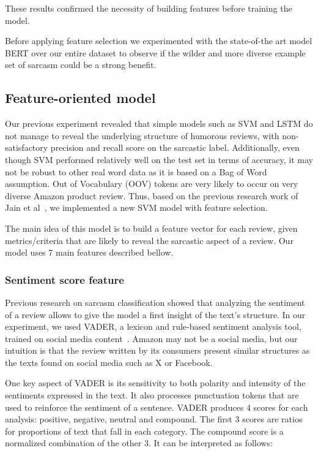 \documentclass[10pt,twocolumn,letterpaper]{article}
\begin{document}
These results confirmed the necessity of building features before training the model.

Before applying feature selection we experimented with the state-of-the art model BERT over our entire dataset to observe if the wilder and more diverse example set of sarcasm could be a strong benefit.

\subsection{Feature-oriented model}

Our previous experiment revealed that simple models such as SVM and LSTM do not manage to reveal the underlying structure of humorous reviews, with non-satisfactory precision and recall score on the sarcastic label.
Additionally, even though SVM performed relatively well on the test set in terms of accuracy, it may not be robust to other real word data as it is based on a Bag of Word assumption. Out of Vocabulary (OOV) tokens are very likely to occur on very diverse Amazon product review.
Thus, based on the previous research work of Jain et al~\cite{jain2019}, we implemented a new SVM model with feature selection.

The main idea of this model is to build a feature vector for each review, given metrics/criteria that are likely to reveal the sarcastic aspect of a review.
Our model uses 7 main features described bellow.

\subsubsection{Sentiment score feature}

Previous research on sarcasm classification showed that analyzing the sentiment of a review allows to give the model a first insight of the text's structure.
In our experiment, we used VADER, a lexicon and rule-based sentiment analysis tool, trained on social media content~\cite{icwsm2014}.
Amazon may not be a social media, but our intuition is that the review written by its consumers present similar structures as the texts found on social media such as X or Facebook.

One key aspect of VADER is its sensitivity to both polarity and intensity of the sentiments expressed in the text.
It also processes punctuation tokens that are used to reinforce the sentiment of a sentence.
VADER produces 4 scores for each analysis: positive, negative, neutral and compound.
The first 3 scores are ratios for proportions of text that fall in each category. The compound score is a normalized combination of the other 3.
It can be interpreted as follows:
\end{document}
